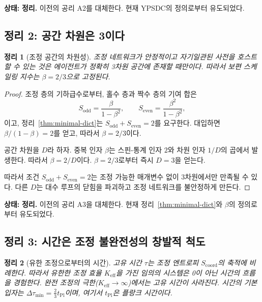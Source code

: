 \documentclass[12pt,a4paper]{article}
\newtheorem{theorem}{정리}[section]
\begin{document}
	\textbf{상태:} \textbf{정리.} 이전의 공리 A2를 대체한다. 현재 YPSDC의 정의로부터 유도되었다.
	
	\subsection{정리 2: 공간 차원은 3이다}
	
	\begin{theorem}[조정 공간의 차원성]
		\label{thm:dimension}
		조정 네트워크가 안정적이고 자기일관된 사전을 호스트할 수 있는 것은 에이전트가 정확히 3차원 공간에 존재할 때만이다. 따라서 보편 스케일링 지수는 \(\beta = 2/3\)으로 고정된다.
	\end{theorem}
	
	\begin{proof}
		조정 층의 기하급수로부터, 홀수 층과 짝수 층의 기여 합은
		\[
		S_{\mathrm{odd}} = \frac{\beta}{1-\beta^2}, \qquad
		S_{\mathrm{even}} = \frac{\beta^2}{1-\beta^2},
		\]
		이고, 정리~\ref{thm:minimal-dict}는 \(S_{\mathrm{odd}} + S_{\mathrm{even}} = 2\)를 요구한다.
		대입하면 \(\beta/(1-\beta) = 2\)를 얻고, 따라서 \(\beta = 2/3\)이다.
		
		공간 차원을 \(D\)라 하자. 중복 인자 \(\beta\)는 스핀-통계 인자 \(2\)와 차원 인자 \(1/D\)의 곱에서 발생한다. 따라서 \(\beta = 2/D\)이다. \(\beta = 2/3\)로부터 즉시 \(D = 3\)을 얻는다.
		
		따라서 조건 \(S_{\mathrm{odd}} + S_{\mathrm{even}} = 2\)는 조정 가능한 매개변수 없이 3차원에서만 만족될 수 있다. 다른 \(D\)는 대수 루프의 닫힘을 파괴하고 조정 네트워크를 불안정하게 만든다.
	\end{proof}
	
	\textbf{상태:} \textbf{정리.} 이전의 공리 A3을 대체한다. 현재 정리~\ref{thm:minimal-dict}와 \(\beta\)의 정의로부터 유도되었다.
	
	\subsection{정리 3: 시간은 조정 불완전성의 창발적 척도}
	
	\begin{theorem}[유한 조정으로부터의 시간]
		\label{thm:time}
		고유 시간 \(\tau\)는 조정 엔트로피 \(S_{\mathrm{coord}}\)의 축적에 비례한다. 따라서 유한한 조정 효율 \(K_{\mathrm{eff}}\)을 가진 임의의 시스템은 0이 아닌 시간의 흐름을 경험한다. 완전 조정의 극한(\(K_{\mathrm{eff}} \to \infty\))에서는 고유 시간이 사라진다. 시간의 기본 입자는 \(\Delta \tau_{\min} = \frac{2}{3} t_{\mathrm{Pl}}\)이며, 여기서 \(t_{\mathrm{Pl}}\)은 플랑크 시간이다.
	\end{theorem}
	
\end{document}

